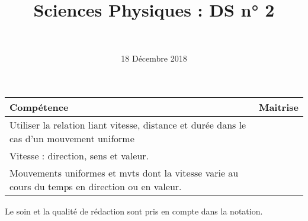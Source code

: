 \documentclass[a4paper,11pt]{exam}
\author{\ }
\date{18 Décembre 2018}
\title{Sciences Physiques : DS n° 2}
\begin{document}
%	


	\maketitle


\begin{small}
	\begin{center}
		\begin{tabular}{|@{\ }l@{}|@{\ }c@{\ }|}
			\hline
			\textbf{Compétence} & \textbf{Maitrise} \\
			\hline
			 Utiliser la relation liant vitesse, distance et durée dans le cas d’un mouvement uniforme \ \ &  \ \ \ \\
			\hline
			Vitesse : direction, sens et valeur. &  \\
			\hline			
			Mouvements uniformes et mvts dont la vitesse varie au cours du temps en direction ou en valeur.  &  \\
			\hline
			
		\end{tabular}
	\end{center}
\end{small}	
%	

Le soin et la qualité de rédaction sont pris en compte dans la notation.

\vspace*{-0.5cm}
%










%
%





\ \label{LastPage}
\end{document}
